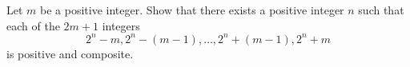 Let $m$ be a positive integer.
Show that there exists a positive integer $n$ such that each of the $2m+1$ integers \[2^{n}-m,2^{n}-(m-1),\ldots,2^{n}+(m-1),2^{n}+m\] is positive and composite.
